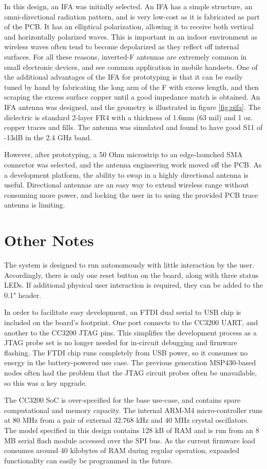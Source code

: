 In this design, an IFA was initially selected. An IFA has a simple structure, an omni-directional radiation pattern, and is very low-cost as it is fabricated as part of the PCB. It has an elliptical polarization, allowing it to receive both vertical and horizontally polarized waves\cite{Huynh2000}. This is important in an indoor environment as wireless waves often tend to become depolarized as they reflect off internal surfaces. For all these reasons, inverted-F antennas are extremely common in small electronic devices, and see common application in mobile handsets. One of the additional advantages of the IFA for prototyping is that it can be easily tuned by hand by fabricating the long arm of the F with excess length, and then scraping the excess surface copper until a good impedance match is obtained. An IFA antenna was designed, and the geometry is illustrated in figure \ref{fig:pifa}. The dielectric is standard 2-layer FR4 with a thickness of 1.6mm (63 mil) and 1 oz. copper traces and fills. The antenna  was simulated and found to have good S11 of -13dB in the 2.4 GHz band. 

However, after prototyping, a 50 Ohm microstrip to an edge-launched SMA connector was selected, and the antenna engineering work moved off the PCB. As a development platform, the ability to swap in a highly directional antenna is useful. Directional antennas are an easy way to extend wireless range without consuming more power, and locking the user in to using the provided PCB trace antenna is limiting.

\section{Other Notes}

The system is designed to run autonomously with little interaction by the user. Accordingly, there is only one reset button on the board, along with three status LEDs. If additional physical user interaction is required, they can be added to the 0.1" header. 

In order to facilitate easy development, an FTDI dual serial to USB chip is included on the board's footprint. One port connects to the CC3200 UART, and another to the CC3200 JTAG pins. This simplifies the development process as a JTAG probe set is no longer needed for in-circuit debugging and firmware flashing. The FTDI chip runs completely from USB power, so it consumes no energy in the battery-powered use case. The previous generation MSP430-based nodes often had the problem that the JTAG circuit probes often be unavailable, so this was a key upgrade.

The CC3200 SoC is over-specified for the base use-case, and contains spare computational and memory capacity. The internal ARM-M4 micro-controller runs at 80 MHz from a pair of external 32.768 kHz and 40 MHz crystal oscillators. The model specified in this design contains 128 kB of RAM and is run from an 8 MB serial flash module accessed over the SPI bus. As the current firmware load consumes around 40 kilobytes of RAM during regular operation, expanded functionality can easily be programmed in the future.


